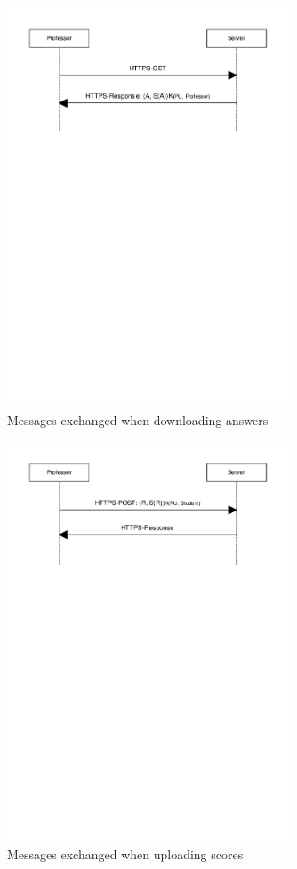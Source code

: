 \documentclass{article}
\begin{document}
\begin{figure}
\begin{center}
\includegraphics[width=0.75\textwidth]{images/download_answers.pdf}
\caption{Messages exchanged when downloading answers}
\label{fig:download-answers}
\end{center}
\end{figure}

\begin{figure}
\begin{center}
\includegraphics[width=0.75\textwidth]{images/upload_scores.pdf}
\caption{Messages exchanged when uploading scores}
\label{fig:upload-scores}
\end{center}
\end{figure}
\end{document}
